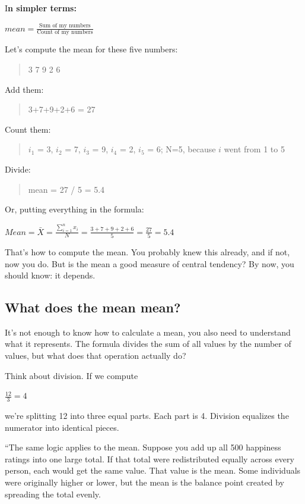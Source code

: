 \documentclass[
  letterpaper,
  DIV=11,
  numbers=noendperiod]{scrreprt}
\begin{document}
I\textbf{n simpler terms:}

\(mean = \frac{\text{Sum of my numbers}}{\text{Count of my numbers}}\)

Let's compute the mean for these five numbers:

\begin{quote}
3 7 9 2 6
\end{quote}

Add them:

\begin{quote}
3+7+9+2+6 = 27
\end{quote}

Count them:

\begin{quote}
\(i_{1}\) = 3, \(i_{2}\) = 7, \(i_{3}\) = 9, \(i_{4}\) = 2, \(i_{5}\) =
6; N=5, because \(i\) went from 1 to 5
\end{quote}

Divide:

\begin{quote}
mean = 27 / 5 = 5.4
\end{quote}

Or, putting everything in the formula:

\(Mean = \bar{X} = \frac{\sum_{i=1}^{n} x_{i}}{N} = \frac{3+7+9+2+6}{5} = \frac{27}{5} = 5.4\)

That's how to compute the mean. You probably knew this already, and if
not, now you do. But is the mean a good measure of central tendency? By
now, you should know: it depends.

\subsection{What does the mean mean?}\label{what-does-the-mean-mean}

It's not enough to know how to calculate a mean, you also need to
understand what it represents. The formula divides the sum of all values
by the number of values, but what does that operation actually do?

Think about division. If we compute

\(\frac{12}{3} = 4\)

we're splitting 12 into three equal parts. Each part is 4. Division
equalizes the numerator into identical pieces.

``The same logic applies to the mean. Suppose you add up all 500
happiness ratings into one large total. If that total were redistributed
equally across every person, each would get the same value. That value
is the mean. Some individuals were originally higher or lower, but the
mean is the balance point created by spreading the total evenly.
\end{document}
